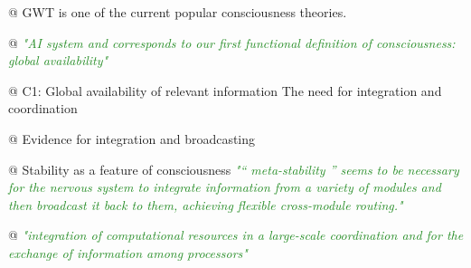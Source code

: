 \documentclass[utf8]{article}
\newenvironment{ants}
			{
			 \begin{easylist}[itemize]
			}
			{
			\end{easylist}
			}
\newcommand{\rewrite}[1]{\textcolor{ForestGreen}{\textit{"#1"}}\newline}
\begin{document}
		
			\begin{ants}
				@ GWT is one of the current popular consciousness theories.
				
				@ \rewrite{AI system and corresponds to our first functional definition of consciousness: global availability} \cite{Dehaene2017}
				
				@ C1: Global availability of relevant information The need for integration and coordination \cite{Dehaene2017}
				
				@ Evidence for integration and broadcasting
				
				@ Stability as a feature of consciousness \rewrite{“ meta-stability ” seems to be necessary for the nervous system to integrate information from a variety of modules and then broadcast it back to them, achieving flexible cross-module routing.}
				
				@ \rewrite{integration of computational resources in a large-scale coordination and for the exchange of information among processors}
				

\end{ants}
\end{document}
